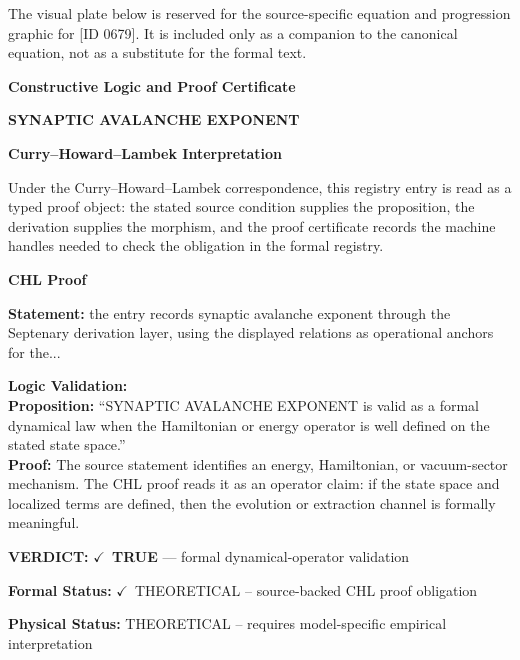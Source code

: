 \begingroup\footnotesize\sloppy
The visual plate below is reserved for the source-specific equation and progression graphic for [ID 0679]. It is included only as a companion to the canonical equation, not as a substitute for the formal text.
\par\endgroup
\ifTZPDarkEdition
{}
\fi

\clearpage
\begingroup\tzpsupportsetup
\noindent\textbf{\fontsize{10.8pt}{12.8pt}\selectfont [ID 0679] Constructive Logic and Proof Certificate}\par
\noindent\textbf{\fontsize{10pt}{12pt}\selectfont SYNAPTIC AVALANCHE EXPONENT}\par
\vspace{0.45em}
\begingroup
\footnotesize
\setlength{\parskip}{0.22em}
\setlength{\parindent}{0pt}
\noindent\textbf{Curry--Howard--Lambek Interpretation}\par
Under the Curry--Howard--Lambek correspondence, this registry entry is read as a typed proof
object: the stated source condition supplies the proposition, the derivation supplies the
morphism, and the proof certificate records the machine handles needed to check the obligation
in the formal registry.

\vspace{0.45em}
\noindent\textbf{CHL Proof}\par
\textbf{Statement:} the entry records synaptic avalanche exponent through the Septenary derivation layer,
using the displayed relations as operational anchors for the...

\textbf{Logic Validation:}\\
\textbf{Proposition:} ``SYNAPTIC AVALANCHE EXPONENT is valid as a formal dynamical law when the Hamiltonian or
energy operator is well defined on the stated state space.''\\
\textbf{Proof:} The source statement identifies an energy, Hamiltonian, or vacuum-sector mechanism. The
CHL proof reads it as an operator claim: if the state space and localized terms are
defined, then the evolution or extraction channel is formally meaningful.

\textbf{VERDICT:} \ensuremath{\checkmark}\ \textbf{TRUE} --- formal dynamical-operator validation

\textbf{Formal Status:} \ensuremath{\checkmark}\ THEORETICAL -- source-backed CHL proof obligation

\textbf{Physical Status:} THEORETICAL -- requires model-specific empirical interpretation
\par\vspace{0.45em}
\par
\ifTZPDarkEdition
{}
\fi
\endgroup
\endgroup

